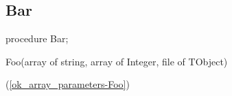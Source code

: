 \documentclass{report}
\newif\ifpdf
\begin{document}
\subsection*{Bar}
\fi
\label{ok_array_parameters-Bar}
\begin{list}{}{
\setlength{\itemindent}{0cm}
\setlength{\listparindent}{0cm}
\setlength{\leftmargin}{\evensidemargin}
\addtolength{\leftmargin}{\tmplength}
\settowidth{\labelsep}{X}
\addtolength{\leftmargin}{\labelsep}
\setlength{\labelwidth}{\tmplength}
}
\item[\textbf{Declaration}\hfill]
\ifpdf
\begin{flushleft}
\fi
\begin{ttfamily}
procedure Bar;\end{ttfamily}

\ifpdf
\end{flushleft}
\fi

\par
\item[\textbf{Description}]
\begin{ttfamily}Foo(array of string, array of Integer, file of TObject)\end{ttfamily}(\ref{ok_array_parameters-Foo})

\end{list}
\end{document}
